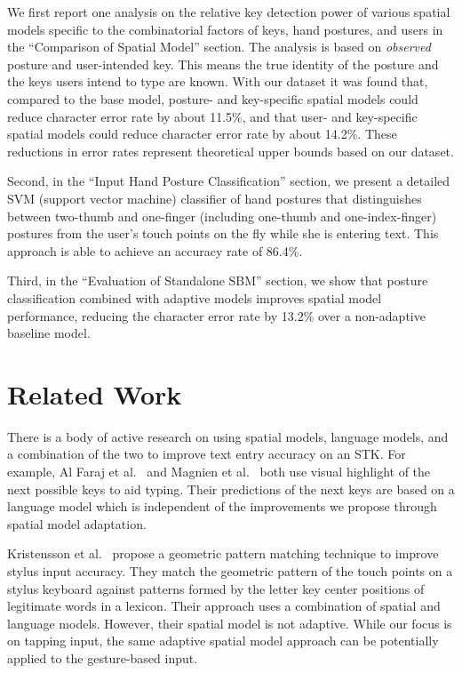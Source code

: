 \documentclass{sigchi}
\begin{document}
We first report one analysis on the 
relative key detection power of various spatial models specific to the 
combinatorial factors of keys, hand postures, and users in the ``Comparison of
Spatial Model'' section. The analysis is based on \textit{observed} posture and
user-intended key. This means the true
identity of the posture and the keys users intend to type are
known.
With our dataset it was found that, compared to
the base model, posture- and key-specific spatial models could reduce character
error rate by about 11.5\%, and that user- and key-specific spatial models could
reduce character error rate by about 14.2\%. These reductions in error rates
represent theoretical upper bounds based on our dataset.

Second, in the ``Input Hand Posture Classification'' section, we present a detailed 
SVM (support vector machine) classifier of hand postures that distinguishes between 
two-thumb and one-finger (including one-thumb and one-index-finger) postures
from the user's touch points on the fly while she is entering text. This
approach is able to achieve an accuracy rate of 86.4\%.

Third, in the ``Evaluation of Standalone SBM'' section, we show that posture
classification combined with adaptive models improves spatial model performance,
reducing the character error rate by 13.2\% over a non-adaptive baseline model.

\pagebreak

\section{Related Work}

There is a body of active research on using spatial models, language models, and a combination
of the two to improve text entry accuracy on an STK. For example, 
Al Faraj et al.~\cite{AlFaraj:2009} and Magnien et al.~\cite{Magnien:2004} both use
visual highlight of the next possible keys to aid typing. Their predictions of the next keys are based on a language model which is independent of the improvements we propose through spatial model adaptation.

Kristensson et al.~\cite{Kristensson:2005} propose a geometric pattern matching technique to improve 
stylus input accuracy. They match the geometric pattern of the touch points on a stylus keyboard against patterns formed by 
the letter key center positions of legitimate words in a lexicon. 
Their approach uses a combination of spatial and language models. However, 
their spatial model is not adaptive. While our focus is on tapping input, the same adaptive spatial model approach
can be potentially applied to the gesture-based input.
\end{document}
